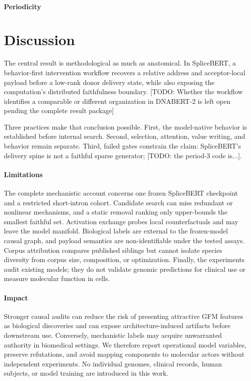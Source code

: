 \documentclass{article}
\begin{document}
\paragraph{Periodicity}


\section{Discussion}

The central result is methodological as much as anatomical.  In SpliceBERT, a behavior-first intervention workflow recovers a relative address and acceptor-local payload before a low-rank donor delivery state, while also exposing the computation's distributed faithfulness boundary. [TODO: Whether the workflow identifies a comparable or different organization in DNABERT-2 is left open pending the complete result package]

Three practices make that conclusion possible.  First, the model-native behavior is established before internal search.  Second, selection, attention, value writing, and behavior remain separate.  Third, failed gates constrain the claim: SpliceBERT's delivery spine is not a faithful sparse generator; [TODO: the period-3 code is...].

\paragraph{Limitations}
The complete mechanistic account concerns one frozen SpliceBERT checkpoint and a restricted short-intron cohort. Candidate search can miss redundant or nonlinear mechanisms, and a static removal ranking only upper-bounds the smallest faithful set.  Activation exchange probes local counterfactuals and may leave the model manifold.  Biological labels are external to the frozen-model causal graph, and
payload semantics are non-identifiable under the tested assays.  Corpus attribution compares published siblings but cannot isolate species diversity from corpus size, composition, or optimization.  Finally, the experiments audit existing models; they do not validate genomic predictions for clinical use or measure molecular function in cells.

\paragraph{Impact}
Stronger causal audits can reduce the risk of presenting attractive GFM features as biological discoveries and can expose architecture-induced artifacts before downstream use. Conversely, mechanistic labels may acquire unwarranted authority in biomedical settings.  We therefore report operational model variables, preserve refutations, and avoid mapping components to molecular actors without independent experiments.  No individual genomes, clinical records, human subjects, or model training are introduced in this work.
\end{document}
